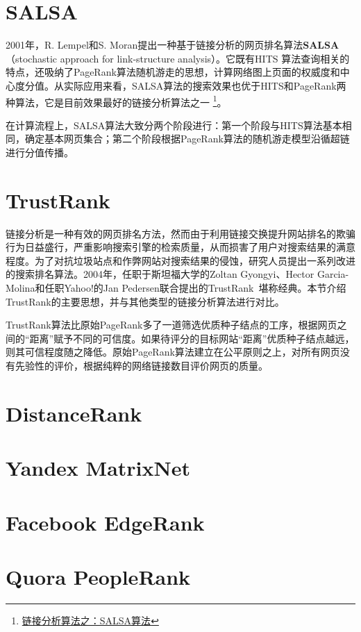 \section{SALSA}
2001年，R. Lempel和S. Moran\cite{lempel2001salsa}提出一种基于链接分析的网页排名算法\textbf{SALSA}（stochastic approach for link-structure analysis）。它既有HITS 算法查询相关的特点，还吸纳了PageRank算法随机游走的思想，计算网络图上页面的权威度和中心度分值。从实际应用来看，SALSA算法的搜索效果也优于HITS和PageRank两种算法，它是目前效果最好的链接分析算法之一
\footnote{\href{http://blog.csdn.net/hguisu/article/details/8016916}{链接分析算法之：SALSA算法}}。

在计算流程上，SALSA算法大致分两个阶段进行：第一个阶段与HITS算法基本相同，确定基本网页集合；第二个阶段根据PageRank算法的随机游走模型沿循超链进行分值传播。

\section{TrustRank}
链接分析是一种有效的网页排名方法，然而由于利用链接交换提升网站排名的欺骗行为日益盛行，严重影响搜索引擎的检索质量，从而损害了用户对搜索结果的满意程度。为了对抗垃圾站点和作弊网站对搜索结果的侵蚀，研究人员提出一系列改进的搜索排名算法。2004年，任职于斯坦福大学的Zoltan Gyongyi、Hector Garcia-Molina和任职Yahoo!的Jan Pedersen联合提出的TrustRank~\cite{gyongyi2004combating}堪称经典。本节介绍TrustRank的主要思想，并与其他类型的链接分析算法进行对比。

TrustRank算法比原始PageRank多了一道筛选优质种子结点的工序，根据网页之间的“距离”赋予不同的可信度。如果待评分的目标网站“距离”优质种子结点越远，则其可信程度随之降低。原始PageRank算法建立在公平原则之上，对所有网页没有先验性的评价，根据纯粹的网络链接数目评价网页的质量。

\section{DistanceRank}

\section{Yandex MatrixNet}

\section{Facebook EdgeRank}

\section{Quora PeopleRank}

